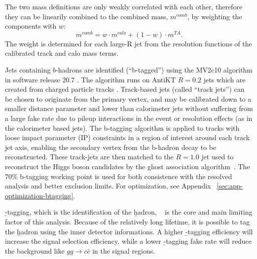 The two mass definitions are only weakly correlated with each other, therefore they can be linearily combined to the combined mass, $m^{comb}$, by weighting the components with $w$:
\begin{equation}
m^{comb} = w\cdot m^{calo}+(1-w)\cdot m^{TA}.
\end{equation}
The weight is determined for each large-R jet from the resolution functions of the calibrated track and calo mass terms.

Jets containing $b$-hadrons are identified (``b-tagged'') using the MV2c10 algorithm in software release 20.7 \cite{ATL-PHYS-PUB-2015-022}. The algorithm runs on AntiKT $R=0.2$ jets which are created from charged particle tracks \cite{ATL-PHYS-PUB-2014-013,ATL-PHYS-PUB-2015-035}. Track-based jets (called ``track jets'') can be chosen to originate from the primary vertex, and may be calibrated down to a smaller distance parameter and lower \pt than calorimeter jets without suffering from a large fake rate due to pileup interactions in the event or resolution effects (as in the calorimeter based jets). The b-tagging algorithm is applied to tracks with loose impact parameter (IP) constraints in a region of interest around each track jet axis, enabling the secondary vertex from the b-hadron decay to be reconstructed. These track-jets are then matched to the $R=1.0$ jet used to reconstruct the Higgs boson candidates by the ghost association algorithm~\cite{Cacciari:2007fd}. The 70\% b-tagging working point is used for both consistence with the resolved analysis and better exclusion limits. For optimization, see Appendix ~\ref{sec:app-optimization-btagging}.

\b-tagging, which is the identification of the \b hadron,  ~\cite{Reco-btag-2016} is the core and main limiting factor of this analysis. Because of the relatively long lifetime, it is possible to tag the \b hadron using the inner detector informations. A higher \b-tagging efficiency will increase the signal selection efficiency, while a lower \b-tagging fake rate will reduce the background like $gg \to c\bar{c}$ in the signal regions.

